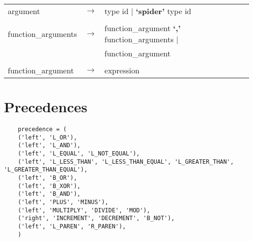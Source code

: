 \documentclass[landscape]{article}
\begin{document}
\begin{longtable}{ l c l}
    \\

    argument & \ensuremath{\to} &  type  id  | \textbf{`spider'} type  id   \\

    \\

    function\_arguments & \ensuremath{\to} &  function\_argument  \textbf{`,'} function\_arguments   | \\
    & &  function\_argument    \\

    \\

    function\_argument & \ensuremath{\to} &  expression  \\

  \end{longtable}

  \section{Precedences}
  \begin{verbatim}
    precedence = (
    ('left', 'L_OR'),
    ('left', 'L_AND'),
    ('left', 'L_EQUAL', 'L_NOT_EQUAL'),
    ('left', 'L_LESS_THAN', 'L_LESS_THAN_EQUAL', 'L_GREATER_THAN', 'L_GREATER_THAN_EQUAL'),
    ('left', 'B_OR'),
    ('left', 'B_XOR'),
    ('left', 'B_AND'),
    ('left', 'PLUS', 'MINUS'),
    ('left', 'MULTIPLY', 'DIVIDE', 'MOD'),
    ('right', 'INCREMENT', 'DECREMENT', 'B_NOT'),
    ('left', 'L_PAREN', 'R_PAREN'),
    )
  \end{verbatim}
\end{document}
